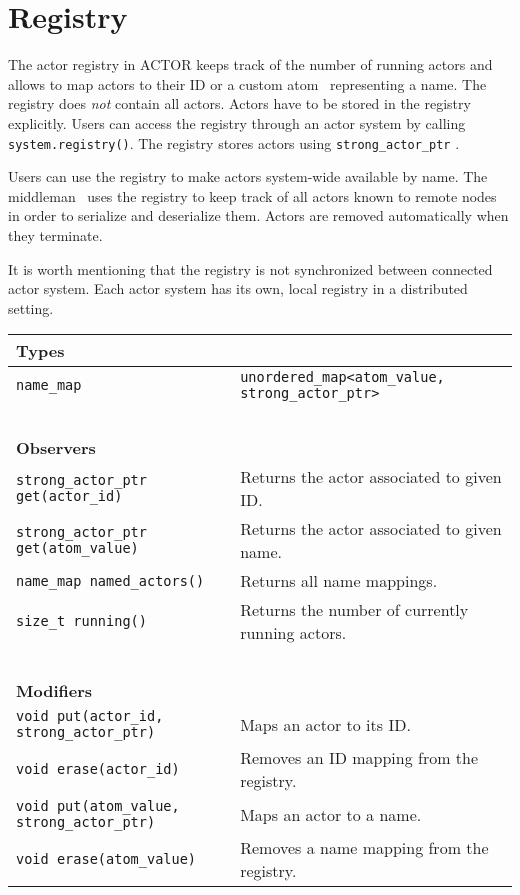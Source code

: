 \section{Registry}
\label{registry}

The actor registry in ACTOR keeps track of the number of running actors and
allows to map actors to their ID or a custom atom~ representing a
name. The registry does \emph{not} contain all actors. Actors have to be stored
in the registry explicitly. Users can access the registry through an actor
system by calling \lstinline^system.registry()^. The registry stores actors
using \lstinline^strong_actor_ptr^ .

Users can use the registry to make actors system-wide available by name. The
middleman~ uses the registry to keep track of all actors known
to remote nodes in order to serialize and deserialize them. Actors are removed
automatically when they terminate.

It is worth mentioning that the registry is not synchronized between connected
actor system. Each actor system has its own, local registry in a distributed
setting.

\begin{center}
\begin{tabular}{ll}
  \textbf{Types} & ~ \\
  \hline
  \lstinline^name_map^ & \lstinline^unordered_map<atom_value, strong_actor_ptr>^ \\
  \hline
  ~ & ~ \\ \textbf{Observers} & ~ \\
  \hline
  \lstinline^strong_actor_ptr get(actor_id)^ & Returns the actor associated to given ID. \\
  \hline
  \lstinline^strong_actor_ptr get(atom_value)^ & Returns the actor associated to given name. \\
  \hline
  \lstinline^name_map named_actors()^ & Returns all name mappings. \\
  \hline
  \lstinline^size_t running()^ & Returns the number of currently running actors. \\
  \hline
  ~ & ~ \\ \textbf{Modifiers} & ~ \\
  \hline
  \lstinline^void put(actor_id, strong_actor_ptr)^ & Maps an actor to its ID. \\
  \hline
  \lstinline^void erase(actor_id)^ & Removes an ID mapping from the registry. \\
  \hline
  \lstinline^void put(atom_value, strong_actor_ptr)^ & Maps an actor to a name. \\
  \hline
  \lstinline^void erase(atom_value)^ & Removes a name mapping from the registry. \\
  \hline
\end{tabular}
\end{center}
